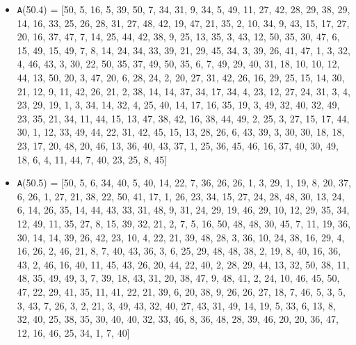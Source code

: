 \documentclass[runningheads, a4paper]{llncs}
\begin{document}
\begin{itemize}
	\item {\texttt A(50.4) = } [50, 5, 16, 5, 39, 50, 7, 34, 31, 9, 34, 5, 49, 11, 27, 42, 28, 29, 38, 29, 14, 16, 33, 25, 26, 28, 31, 27, 48, 42, 19, 47, 21, 35, 2, 10, 34, 9, 43, 15, 17, 27, 20, 16, 37, 47, 7, 14, 25, 44, 42, 38, 9, 25, 13, 35, 3, 43, 12, 50, 35, 30, 47, 6, 15, 49, 15, 49, 7, 8, 14, 24, 34, 33, 39, 21, 29, 45, 34, 3, 39, 26, 41, 47, 1, 3, 32, 4, 46, 43, 3, 30, 22, 50, 35, 37, 49, 50, 35, 6, 7, 49, 29, 40, 31, 18, 10, 10, 12, 44, 13, 50, 20, 3, 47, 20, 6, 28, 24, 2, 20, 27, 31, 42, 26, 16, 29, 25, 15, 14, 30, 21, 12, 9, 11, 42, 26, 21, 2, 38, 14, 14, 37, 34, 17, 34, 4, 23, 12, 27, 24, 31, 3, 4, 23, 29, 19, 1, 3, 34, 14, 32, 4, 25, 40, 14, 17, 16, 35, 19, 3, 49, 32, 40, 32, 49, 23, 35, 21, 34, 11, 44, 15, 13, 47, 38, 42, 16, 38, 44, 49, 2, 25, 3, 27, 15, 17, 44, 30, 1, 12, 33, 49, 44, 22, 31, 42, 45, 15, 13, 28, 26, 6, 43, 39, 3, 30, 30, 18, 18, 23, 17, 20, 48, 20, 46, 13, 36, 40, 43, 37, 1, 25, 36, 45, 46, 16, 37, 40, 30, 49, 18, 6, 4, 11, 44, 7, 40, 23, 25, 8, 45]
	\item {\texttt A(50.5) = } [50, 5, 6, 34, 40, 5, 40, 14, 22, 7, 36, 26, 26, 1, 3, 29, 1, 19, 8, 20, 37, 6, 26, 1, 27, 21, 38, 22, 50, 41, 17, 1, 26, 23, 34, 15, 27, 24, 28, 48, 30, 13, 24, 6, 14, 26, 35, 14, 44, 43, 33, 31, 48, 9, 31, 24, 29, 19, 46, 29, 10, 12, 29, 35, 34, 12, 49, 11, 35, 27, 8, 15, 39, 32, 21, 2, 7, 5, 16, 50, 48, 48, 30, 45, 7, 11, 19, 36, 30, 14, 14, 39, 26, 42, 23, 10, 4, 22, 21, 39, 48, 28, 3, 36, 10, 24, 38, 16, 29, 4, 16, 26, 2, 46, 21, 8, 7, 40, 43, 36, 3, 6, 25, 29, 48, 48, 38, 2, 19, 8, 40, 16, 36, 43, 2, 46, 16, 40, 11, 45, 43, 26, 20, 44, 22, 40, 2, 28, 29, 44, 13, 32, 50, 38, 11, 48, 35, 49, 49, 3, 7, 39, 18, 43, 31, 20, 38, 47, 9, 48, 41, 2, 24, 10, 46, 45, 50, 47, 22, 29, 41, 35, 11, 41, 22, 21, 39, 6, 20, 38, 9, 26, 26, 27, 18, 7, 46, 5, 3, 5, 3, 43, 7, 26, 3, 2, 21, 3, 49, 43, 32, 40, 27, 43, 31, 49, 14, 19, 5, 33, 6, 13, 8, 32, 40, 25, 38, 35, 30, 40, 40, 32, 33, 46, 8, 36, 48, 28, 39, 46, 20, 20, 36, 47, 12, 16, 46, 25, 34, 1, 7, 40]
	

\end{itemize}
\end{document}
